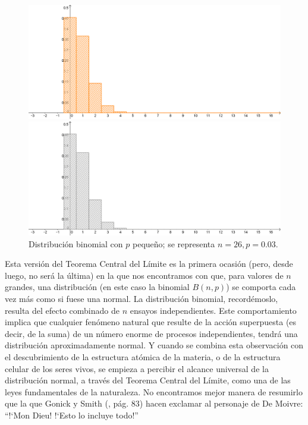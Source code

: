 \begin{figure}[htbp]
\begin{center}
\begin{enColor}
\includegraphics[width=13cm]{../fig/Cap05-BinomialVsNormal-TCL-2.png}
\end{enColor}
\begin{bn}
\includegraphics[width=13cm]{../fig/Cap05-BinomialVsNormal-TCL-2-bn.png}
\end{bn}
\caption{Distribución binomial con $p$ pequeño; se representa $n=26, p=0.03$. }
\label{cap05:fig:TCLcasonovalido}
\end{center}
\end{figure}

Esta versión del Teorema Central del Límite es la primera ocasión (pero, desde luego, no será la última) en la que nos encontramos con que, para valores de $n$ grandes, una distribución (en este caso la binomial $B(n,p)$) se comporta cada vez más como si fuese una normal. La distribución binomial, recordémoslo, resulta del efecto combinado de $n$ ensayos independientes. Este comportamiento implica que cualquier fenómeno natural que resulte de la acción superpuesta (es decir, de la suma) de un número enorme de procesos independientes, tendrá una distribución aproximadamente normal. Y cuando se combina esta observación con el descubrimiento de la estructura atómica de la materia, o de la estructura celular de los seres vivos, se empieza a percibir el {\sf alcance universal de la distribución normal}, a través del Teorema Central del Límite, como una de las leyes fundamentales de la naturaleza. No encontramos mejor manera de resumirlo que la que Gonick y Smith (\cite{EstadisticaComic}, pág. 83) hacen exclamar al personaje de De Moivre: ``{!`}Mon Dieu! {!`}Esto lo incluye todo!''

